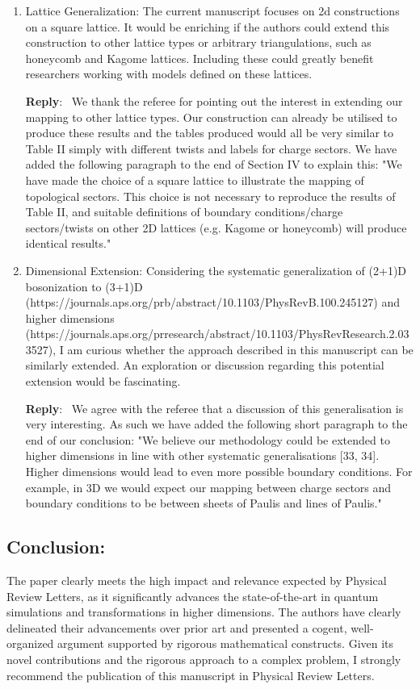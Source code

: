 \documentclass[aps,prx,floatfix,10pt,amssymb,amsfont,amsmath,superscriptaddress,float,nofootinbib,longbibliography,nobalancelastpage]{revtex4-2}
\newenvironment{reply}
   {\medskip \noindent \begin{sf}\textbf{Reply}:\ \color{blue}  }
   {\medskip \end{sf}}
\begin{document}
\begin{enumerate}
\item Lattice Generalization: The current manuscript focuses on 2d constructions on a square lattice. It would be enriching if the authors could extend this construction to other lattice types or arbitrary triangulations, such as honeycomb and Kagome lattices. Including these could greatly benefit researchers working with models defined on these lattices.

\begin{reply}
    We thank the referee for pointing out the interest in extending our mapping to other lattice types. Our construction can already be utilised to produce these results and the tables produced would all be very similar to Table II simply with different twists and labels for charge sectors. We have added the following paragraph to the end of Section IV to explain this: "We have made the choice of a square lattice to illustrate the mapping of topological sectors. This choice is not necessary to reproduce the results of Table II, and suitable definitions of boundary conditions/charge sectors/twists on other 2D lattices (e.g. Kagome or honeycomb) will produce identical results."
\end{reply}

\item Dimensional Extension: Considering the systematic generalization of (2+1)D bosonization to (3+1)D (https://journals.aps.org/prb/abstract/10.1103/PhysRevB.100.245127) and higher dimensions (https://journals.aps.org/prresearch/abstract/10.1103/PhysRevResearch.2.033527), I am curious whether the approach described in this manuscript can be similarly extended. An exploration or discussion regarding this potential extension would be fascinating.

\begin{reply}
    We agree with the referee that a discussion of this generalisation is very interesting. As such we have added the following short paragraph to the end of our conclusion:
    "We believe our methodology could be extended to higher dimensions in line with other systematic generalisations [33, 34]. Higher dimensions would lead to even more possible boundary conditions. For example, in 3D we would expect our mapping between charge sectors and boundary conditions to be between sheets of Paulis and lines of Paulis."
\end{reply}
\end{enumerate}

\subsection*{Conclusion:}

The paper clearly meets the high impact and relevance expected by Physical Review Letters, as it significantly advances the state-of-the-art in quantum simulations and transformations in higher dimensions. The authors have clearly delineated their advancements over prior art and presented a cogent, well-organized argument supported by rigorous mathematical constructs. Given its novel contributions and the rigorous approach to a complex problem, I strongly recommend the publication of this manuscript in Physical Review Letters.
\end{document}
